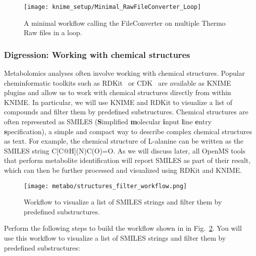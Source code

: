 \begin{figure}
\centering
\texttt{[image: knime\_setup/Minimal\_RawFileConverter\_Loop]}
\caption{A minimal workflow calling the FileConverter on multiple Thermo Raw files in a loop.}
\label{fig:knime_minimal_loop}
\end{figure}

\subsubsection{Digression: Working with chemical structures}
Metabolomics analyses often involve working with chemical structures. Popular cheminformatic toolkits such as RDKit~\cite{rdkit} or CDK~\cite{cdk} are available as KNIME plugins and allow us to work with chemical structures directly from within KNIME. In particular, we will use KNIME and RDKit to visualize a list of compounds and filter them by predefined substructures. Chemical structures are often represented as SMILES (\textbf{S}implified \textbf{m}olecular \textbf{i}nput \textbf{l}ine \textbf{e}ntry \textbf{s}pecification), a simple and compact way to describe complex chemical structures as text. For example, the chemical structure of L-alanine can be written as the SMILES string C[C@H](N)C(O)=O. As we will discuss later, all OpenMS tools that perform metabolite identification will report SMILES as part of their result, which can then be further processed and visualized using RDKit and KNIME.

\begin{figure}
\centering
\texttt{[image: metabo/structures\_filter\_workflow.png]}
\caption{Workflow to visualize a list of SMILES strings and filter them by predefined substructures.}
\label{fig:structures_filter_workflow}
\end{figure}

\noindent Perform the following steps to build the workflow shown in in Fig.~\ref{fig:structures_filter_workflow}. You will use this workflow to visualize a list of SMILES strings and filter them by predefined substructures:

